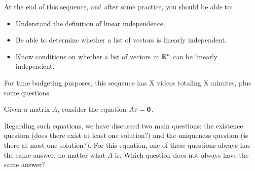 

\usepackage{enumerate}







At the end of this sequence, and after some practice, you should be able to:

\begin{itemize}
\item Understand the definition of linear independence.  
\item Be able to determine whether a list of vectors is linearly independent. 
\item Know conditions on whether a list of vectors in $\mathbb R^n$ can be linearly independent.
\end{itemize}


For time budgeting purposes, this sequence has X videos totaling X minutes, 
plus some questions.  




\endedxtext

\endedxvertical





Given a matrix $A$, consider the equation $Ax = \mathbf{0}$.   

Regarding such equations, we have discussed two main questions: the existence question
(does there exist at least one solution?) and the uniqueness question (is there at most one
solution?).  For this equation, one of these questions always has the same answer, no matter
what $A$ is.  Which question does not always have the same answer?  



\endedxproblem



